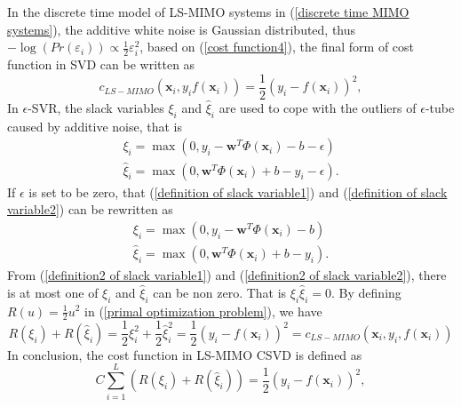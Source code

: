 In the discrete time model of LS-MIMO systems in (\ref{discrete time MIMO systems}), the additive white noise is Gaussian distributed, thus $-\log(Pr(\varepsilon_{i}))\varpropto \frac{1}{2}\varepsilon^{2}_{i}$, based on (\ref{cost function4}), the final form of cost function in SVD can be written as 
\begin{equation}
c_{LS-MIMO}(\mathbf{x}_{i}, y_{i} f(\mathbf{x}_{i}))= \frac{1}{2}(y_{i}-f(\mathbf{x}_{i}))^{2},
\label{final cost function}
\end{equation}  
In $\epsilon$-SVR, the slack variables $\xi_{i}$ and $\hat{\xi}_{i}$ are used to cope with the outliers of $\epsilon$-tube caused by additive noise, that is  
\begin{eqnarray}
\label{definition of slack variable1}
\xi_{i}=\max(0, y_{i}-\mathbf{w}^{T}\Phi(\mathbf{x}_{i})-b-\epsilon)\\
\label{definition of slack variable2}
\hat{\xi}_{i}=\max(0, \mathbf{w}^{T}\Phi(\mathbf{x}_{i})+b-y_{i}-\epsilon).
\end{eqnarray} 
If $\epsilon$ is set to be zero, that (\ref{definition of slack variable1}) and (\ref{definition of slack variable2}) can be rewritten as 
\begin{eqnarray}
\label{definition2 of slack variable1}
\xi_{i}=\max(0, y_{i}-\mathbf{w}^{T}\Phi(\mathbf{x}_{i})-b)\\
\label{definition2 of slack variable2}
\hat{\xi}_{i}=\max(0, \mathbf{w}^{T}\Phi(\mathbf{x}_{i})+b-y_{i}).
\end{eqnarray} 
From (\ref{definition2 of slack variable1}) and (\ref{definition2 of slack variable2}), there is at most one of $\xi_{i}$ and $\hat{\xi}_{i}$ can be non zero. That is $\xi_{i}\hat{\xi}_{i}=0$. 
By defining $R(u)=\frac{1}{2}u^{2}$ in (\ref{primal optimization problem}), we have  
\begin{equation}
R(\xi_{i})+R(\hat{\xi}_{i})=\frac{1}{2}\xi^{2}_{i}+\frac{1}{2}\hat{\xi}^{2}_{i}=\frac{1}{2}(y_{i}-f(\mathbf{x}_{i}))^{2}=c_{LS-MIMO}(\mathbf{x}_{i}, y_{i}, f(\mathbf{x}_{i}))
\label{final form of cost function in LS-MIMO}
\end{equation} 
In conclusion, the cost function in LS-MIMO CSVD is defined as 
\begin{equation}
C\sum_{i=1}^{L}(R(\xi_{i})+R(\hat{\xi}_{i}))=\frac{1}{2}(y_{i}-f(\mathbf{x}_{i}))^{2},
\label{LS-MIMO cost function}
\end{equation}
